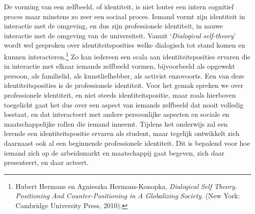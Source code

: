 \documentclass[smallauthor, chapterhaspagenum, nochapterinheader, pagenuminheader,  bigchapnum,medium2, tocpages,  garamond, titleinheader]{jote-book}
\begin{document}
	De vorming van een zelfbeeld, of identiteit, is niet louter een intern cognitief proces maar minstens zo zeer een sociaal proces. Iemand vormt zijn identiteit in interactie met de omgeving, en dus zijn professionele identiteit, in nauwe interactie met de omgeving van de universiteit. Vanuit ‘\emph{Dialogical}\emph{ }\emph{self-theory}' wordt wel gesproken over identiteitsposities welke dialogisch tot stand komen en kunnen interacteren.\footnote{Hubert Hermans en Agnieszka Hermans-Konopka, \emph{Dialogical}\emph{ }\emph{Self}\emph{ }\emph{Theory}\emph{. Positioning }\emph{And}\emph{ Counter-Positioning in A }\emph{Globalizing}\emph{ Society}. (New York: Cambridge University Press, 2010).} Zo kan iedereen een scala aan identiteitsposities ervaren die in interactie met elkaar iemands zelfbeeld vormen, bijvoorbeeld als opgewekt persoon, als familielid, als kunstliefhebber, als activist enzovoorts. Een van deze identiteitsposities is de professionele identiteit. Voor het gemak spreken we over professionele identiteit, en niet steeds identiteitspositie, maar zoals hierboven toegelicht gaat het dus over een aspect van iemands zelfbeeld dat nooit volledig losstaat, en dat interacteert met andere persoonlijke aspecten en sociale en maatschappelijke rollen die iemand inneemt. Tijdens het onderwijs zal een lerende een identiteitspositie ervaren als student, maar tegelijk ontwikkelt zich daarnaast ook al een beginnende professionele identiteit. Dit is bepalend voor hoe iemand zich op de arbeidsmarkt en maatschappij gaat begeven, zich daar presenteert, en daar acteert.
\end{document}
